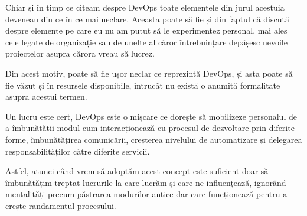 Chiar și în timp ce citeam despre DevOps toate elementele din jurul acestuia
deveneau din ce în ce mai neclare. Aceasta poate să fie și din faptul că
discută despre elemente pe care eu nu am putut să le experimentez personal, mai ales
cele legate de organizație sau de unelte al căror întrebuințare depășesc nevoile
proiectelor asupra cărora vreau să lucrez.

Din acest motiv, poate să fie ușor neclar ce reprezintă DevOps, și asta poate să
fie văzut și în resursele disponibile, întrucât nu există o anumită formalitate
asupra acestui termen.

Un lucru este cert, DevOps este o mișcare ce dorește să mobilizeze personalul
de a îmbunătății modul cum interacționează cu procesul de dezvoltare prin diferite forme,
îmbunătățirea comunicării, creșterea nivelului de automatizare și delegarea responsabilităților
către diferite servicii.

Astfel, atunci când vrem să adoptăm acest concept este suficient doar să îmbunătățim treptat
lucrurile la care lucrăm și care ne influențează, ignorând mentalități precum
păstrarea modurilor antice dar care funcționează pentru a crește randamentul procesului.

